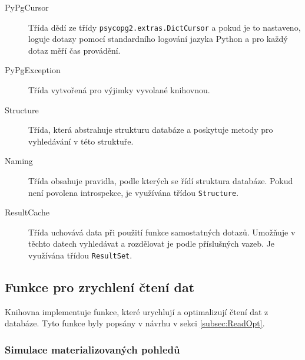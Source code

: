 \documentclass[ing,male,java,dept456]{diploma}						%
\begin{document}
\begin{description}
\item[PyPgCursor] Třída dědí ze třídy \lstinline[style=inlinepython]|psycopg2.extras.DictCursor| a pokud je to nastaveno, loguje dotazy pomocí standardního logování jazyka Python a pro každý dotaz měří čas provádění.
\item[PyPgException] Třída vytvořená pro výjimky vyvolané knihovnou.
\item[Structure] Třída, která abstrahuje strukturu databáze a poskytuje metody pro vyhledávání v této struktuře. 
\item[Naming] Třída obsahuje pravidla, podle kterých se řídí struktura databáze. Pokud není povolena introspekce, je využívána třídou \lstinline[style=inlinepython]|Structure|.
\item[ResultCache] Třída uchovává data při použití funkce samostatných dotazů. Umožňuje v těchto datech vyhledávat a rozdělovat je podle příslušných vazeb. Je využívána třídou \lstinline[style=inlinepython]|ResultSet|.
\end{description}

\subsection{Funkce pro zrychlení čtení dat}

Knihovna implementuje funkce, které urychlují a optimalizují čtení dat z databáze. Tyto funkce byly popsány v návrhu v sekci \ref{subsec:ReadOpt}.

\subsubsection{Simulace materializovaných pohledů}
\end{document}
